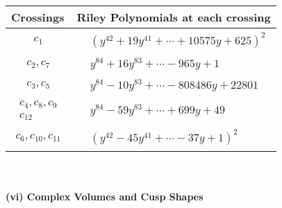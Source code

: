\documentclass[1p]{elsarticle_modified}
\theoremstyle{definition}
\begin{document}
\begin{tabular}{m{50pt}|m{274pt}}
Crossings & \hspace{64pt}Riley Polynomials at each crossing \\
\hline $$\begin{aligned}c_{1}\end{aligned}$$&$\begin{aligned}
&(y^{42}+19 y^{41}+\cdots+10575 y+625)^{2}
\end{aligned}$\\
\hline $$\begin{aligned}c_{2},c_{7}\end{aligned}$$&$\begin{aligned}
&y^{84}+16 y^{83}+\cdots-965 y+1
\end{aligned}$\\
\hline $$\begin{aligned}c_{3},c_{5}\end{aligned}$$&$\begin{aligned}
&y^{84}-10 y^{83}+\cdots-808486 y+22801
\end{aligned}$\\
\hline $$\begin{aligned}c_{4},c_{8},c_{9}\\c_{12}\end{aligned}$$&$\begin{aligned}
&y^{84}-59 y^{83}+\cdots+699 y+49
\end{aligned}$\\
\hline $$\begin{aligned}c_{6},c_{10},c_{11}\end{aligned}$$&$\begin{aligned}
&(y^{42}-45 y^{41}+\cdots-37 y+1)^{2}
\end{aligned}$\\
\hline
\end{tabular}\\~\\
\newpage\flushleft \textbf{(vi) Complex Volumes and Cusp Shapes}
\end{document}
